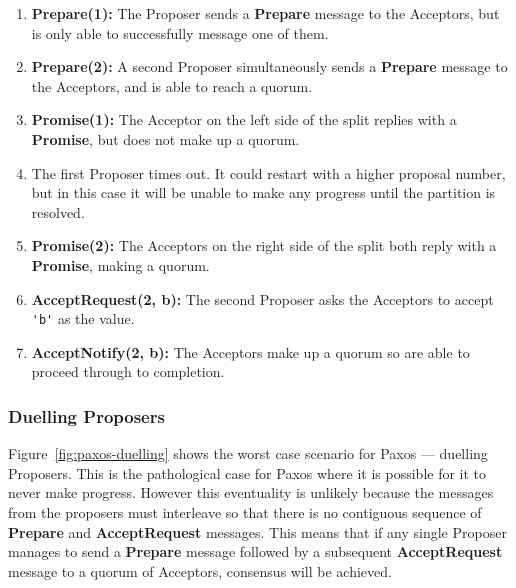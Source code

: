 \documentclass[12pt,twoside,notitlepage]{report}
\newcommand{\msg}[1] {{\bf #1}}         %
\begin{document}
\begin{enumerate}
\item \msg{Prepare(1):} The Proposer sends a \msg{Prepare} message to the Acceptors, but is only
	able to successfully message one of them.
\item \msg{Prepare(2):} A second Proposer simultaneously sends a \msg{Prepare} message to the
	Acceptors, and is able to reach a quorum.
\item \msg{Promise(1):} The Acceptor on the left side of the split replies with a \msg{Promise},
	but does not make up a quorum.
\item The first Proposer times out. It could restart with a higher proposal number, but in this
	case it will be unable to make any progress until the partition is resolved.
\item \msg{Promise(2):} The Acceptors on the right side of the split both reply with a
	\msg{Promise}, making a quorum.
\item \msg{AcceptRequest(2, b):} The second Proposer asks the Acceptors to accept \verb+'b'+ as the
	value.
\item \msg{AcceptNotify(2, b):} The Acceptors make up a quorum so are able to proceed through to
	completion.
\end{enumerate}

\subsubsection*{Duelling Proposers}

Figure~\ref{fig:paxos-duelling} shows the worst case scenario
for Paxos --- duelling Proposers. This is the pathological case for Paxos where it is possible for
it to never make progress. However this eventuality is unlikely because the messages from the proposers
must interleave so that there is no contiguous sequence of \msg{Prepare} and \msg{AcceptRequest}
messages. This means that if any single Proposer manages to send a \msg{Prepare} message followed by a
subsequent \msg{AcceptRequest} message to a quorum of Acceptors, consensus will be achieved.
\end{document}
